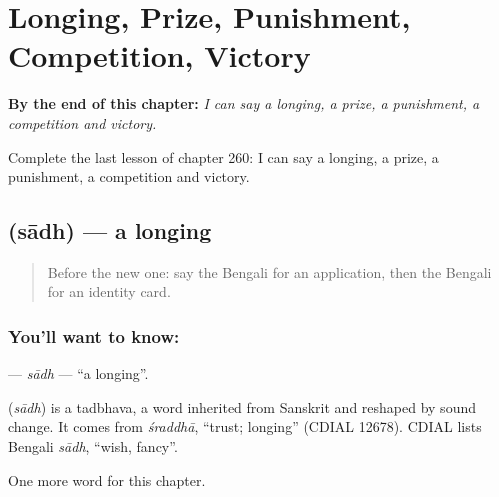
\chapter{Longing, Prize, Punishment, Competition, Victory}
\label{ch:bn-longing-prize-punishment-competition-victory}

\begin{chapteropening}
\textbf{By the end of this chapter:} \emph{I can say a longing, a prize, a punishment, a competition and victory.}

Complete the last lesson of chapter 260: I can say a longing, a prize, a punishment, a competition and victory.
\end{chapteropening}

\section[\texorpdfstring{\bn{সাধ} (sādh)}{সাধ (sādh)}]{ (sādh) — a longing}

\label{lesson:BN-C260-sadh}



\begin{quote}
Before the new one: say the Bengali for an application, then the Bengali for an identity card.
\end{quote}

\subsection*{You'll want to know: }
\textbf{} — \emph{sādh} — \textquotedblleft{}a longing\textquotedblright{}.

\begin{cousinweb}
\textbf{} (\emph{sādh}) is a tadbhava, a word inherited from Sanskrit and reshaped by sound change. It comes from \emph{śraddhā}, \textquotedblleft{}trust; longing\textquotedblright{} (CDIAL 12678). CDIAL lists Bengali \emph{sādh}, \textquotedblleft{}wish, fancy\textquotedblright{}.
\end{cousinweb}

\begin{grammarlens}[title={What you've built}]
One more word for this chapter.
\end{grammarlens}

